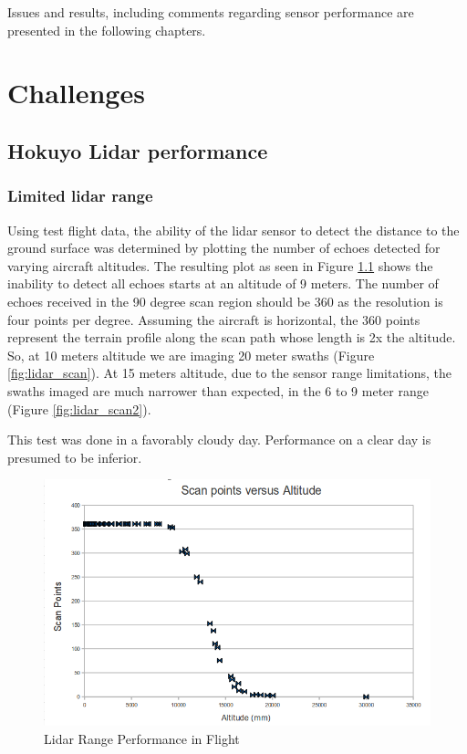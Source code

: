 \documentclass[a4paper,11pt]{report}
\begin{document}
Issues and results, including comments regarding sensor performance are presented in the following chapters.


\chapter{Challenges}

\section{Hokuyo Lidar performance}

\subsection{Limited lidar range}

Using test flight data, the ability of the lidar sensor to detect the distance to the ground surface was determined by plotting the number of echoes detected for varying aircraft altitudes. The resulting plot as seen in Figure \ref{fig:lidar_perf} shows the inability to detect all echoes starts at an altitude of 9 meters. The number of echoes received in the 90 degree scan region should be 360 as the resolution is four points per degree. Assuming the aircraft is horizontal, the 360 points represent the terrain profile along the scan path whose length is 2x the altitude. So, at 10 meters altitude we are imaging 20 meter swaths (Figure \ref{fig:lidar_scan}). At 15 meters altitude, due to the sensor range limitations, the swaths imaged are much narrower than expected, in the 6 to 9 meter range (Figure \ref{fig:lidar_scan2}).

This test was done in a favorably cloudy day. Performance on a clear day is presumed to be inferior.

\begin{figure}[ht]
 \centering
 \includegraphics[width=12cm]{scanpt_v_alt.png}
 \caption{Lidar Range Performance in Flight}
 \label{fig:lidar_perf}
\end{figure}
\end{document}

